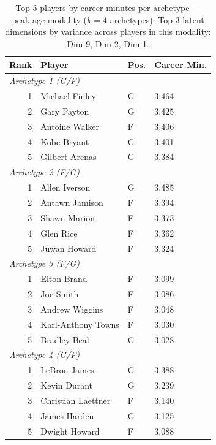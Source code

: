\begin{table}[htbp]
  \centering\small
  \begin{tabular}{rlll}
    \toprule
    Rank & Player & Pos. & Career Min. \\
    \midrule
    \multicolumn{4}{l}{\textit{Archetype 1 (G/F)}} \\
    \midrule
    1 & Michael Finley & G & 3,464 \\
    2 & Gary Payton & G & 3,425 \\
    3 & Antoine Walker & F & 3,406 \\
    4 & Kobe Bryant & G & 3,401 \\
    5 & Gilbert Arenas & G & 3,384 \\
    \midrule[0.4pt]
    \multicolumn{4}{l}{\textit{Archetype 2 (F/G)}} \\
    \midrule
    1 & Allen Iverson & G & 3,485 \\
    2 & Antawn Jamison & F & 3,394 \\
    3 & Shawn Marion & F & 3,373 \\
    4 & Glen Rice & F & 3,362 \\
    5 & Juwan Howard & F & 3,324 \\
    \midrule[0.4pt]
    \multicolumn{4}{l}{\textit{Archetype 3 (F/G)}} \\
    \midrule
    1 & Elton Brand & F & 3,099 \\
    2 & Joe Smith & F & 3,086 \\
    3 & Andrew Wiggins & F & 3,048 \\
    4 & Karl-Anthony Towns & F & 3,030 \\
    5 & Bradley Beal & G & 3,028 \\
    \midrule[0.4pt]
    \multicolumn{4}{l}{\textit{Archetype 4 (G/F)}} \\
    \midrule
    1 & LeBron James & G & 3,388 \\
    2 & Kevin Durant & G & 3,239 \\
    3 & Christian Laettner & F & 3,140 \\
    4 & James Harden & G & 3,125 \\
    5 & Dwight Howard & F & 3,088 \\
    \bottomrule
  \end{tabular}
  \caption{Top 5 players by career minutes per archetype --- peak-age modality ($k=4$ archetypes). Top-3 latent dimensions by variance across players in this modality: Dim 9, Dim 2, Dim 1.}
  \label{tab:arch_reps_peak_age}
\end{table}

